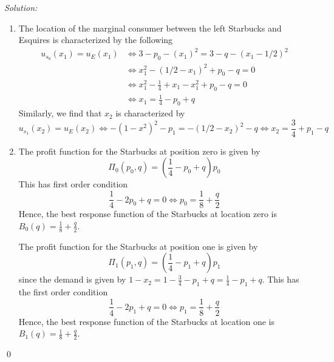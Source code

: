 \documentclass[12pt]{article}
\newenvironment{problem}[2][Problem]{\begin{trivlist}
\item[\hskip \labelsep {\bfseries #1}\hskip \labelsep {\bfseries #2.}]}{\end{trivlist}}
\newenvironment{sol}
    {\emph{Solution:}
    }
    {
    \qed
    }
\begin{document}
\begin{problem}{1}
\end{problem}
\begin{sol}
    \begin{enumerate}[label=\alph*) ]
        \item The location of the marginal consumer between the left Starbucks and Esquires is characterized by the following
        \begin{align*}
            u_{s_0}(x_1) = u_{E}(x_1) &\iff 3 - p_0 -(x_1)^2 = 3 - q - (x_1 - 1/2)^2 \\
            &\iff x_1^2 - (1/2 - x_1)^2 + p_0 - q = 0\\
            &\iff x_1^2 - \frac{1}{4} + x_1 - x_1^2 + p_0 - q = 0\\
            &\iff x_1 = \frac{1}{4} - p_0 + q
         \end{align*}
         Similarly, we find that $x_2$ is characterized by
         \[u_{s_1}(x_2) = u_E(x_2) \iff -(1-x^2)^2 - p_1 = -(1/2 - x_2)^2 - q \iff x_2 = \frac{3}{4} + p_1 - q\]
         \item The profit function for the Starbucks at position zero is given by
         \[\Pi_0(p_0, q) = \left( \frac{1}{4}- p_0 + q\right)p_0\]
         This has first order condition
         \[\frac{1}{4} - 2 p_0 + q = 0 \iff p_0 = \frac{1}{8} + \frac{q}{2}\]
         Hence, the best response function of the Starbucks at location zero is $B_0(q) = \frac{1}{8} + \frac{q}{2}$.

         The profit function for the Starbucks at position one is given by
         \[\Pi_1(p_1, q) = \left(\frac{1}{4} - p_1 + q\right) p_1\]
         since the demand is given by $1 - x_2 = 1- \frac{3}{4} - p_1 + q = \frac{1}{4} - p_1 + q$. This has the first order condition
         \[\frac{1}{4} - 2 p_1 + q = 0 \iff p_1 = \frac{1}{8} + \frac{q}{2}\]
         Hence, the best response function of the Starbucks at location one is $B_1(q) = \frac{1}{8} + \frac{q}{2}$.


\end{enumerate}
\end{sol}
\end{document}
